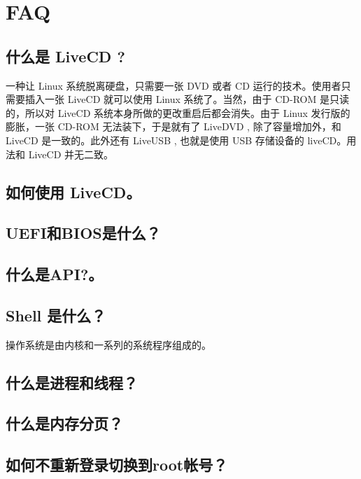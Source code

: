 \renewcommand{\thesection}{\arabic{section}}

\chapter{FAQ}\label{chap:FAQ}

\section{什么是 LiveCD ?}\label{FAQ:LiveCD}
一种让 Linux 系统脱离硬盘，只需要一张 DVD 或者 CD 运行的技术。使用者只需要插入一张 LiveCD 就可以使用 Linux  系统了。当然，由于 CD-ROM 是只读的，所以对 LiveCD 系统本身所做的更改重启后都会消失。由于 Linux 发行版的膨胀，一张 CD-ROM 无法装下，于是就有了 LiveDVD , 除了容量增加外，和LiveCD 是一致的。此外还有 LiveUSB , 也就是使用 USB 存储设备的 liveCD。用法和 LiveCD 并无二致。

\section{如何使用 LiveCD。}\label{FAQ:UseLiveCD}

\section{UEFI和BIOS是什么？}


\section{什么是API?。}\label{FAQ:API}

\section{Shell 是什么？}
操作系统是由内核和一系列的系统程序组成的。

\section{什么是进程和线程？}\label{FAQ:Process}

\section{什么是内存分页？}\label{FAQ:Paging}

\section{如何不重新登录切换到root帐号？}\label{FAQ:su}

